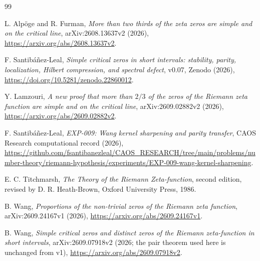 \documentclass[11pt]{article}
\theoremstyle{remark}
\begin{document}
\begin{thebibliography}{99}
\raggedright

L. Alp\"oge and R. Furman,
\emph{More than two thirds of the zeta zeros are simple and on the critical line},
arXiv:2608.13637v2 (2026),
\url{https://arxiv.org/abs/2608.13637v2}.

F. Santib\'a\~nez-Leal,
\emph{Simple critical zeros in short intervals: stability, parity,
localization, Hilbert compression, and spectral defect}, v0.07,
Zenodo (2026),
\url{https://doi.org/10.5281/zenodo.22860012}.

Y. Lamzouri,
\emph{A new proof that more than $2/3$ of the zeros of the Riemann zeta
function are simple and on the critical line},
arXiv:2609.02882v2 (2026),
\url{https://arxiv.org/abs/2609.02882v2}.

F. Santib\'a\~nez-Leal,
\emph{EXP-009: Wang kernel sharpening and parity transfer},
CAOS Research computational record (2026),
\url{https://github.com/fsantibanezleal/CAOS_RESEARCH/tree/main/problems/number-theory/riemann-hypothesis/experiments/EXP-009-wang-kernel-sharpening}.

E. C. Titchmarsh,
\emph{The Theory of the Riemann Zeta-function}, second edition,
revised by D. R. Heath-Brown, Oxford University Press, 1986.

B. Wang,
\emph{Proportions of the non-trivial zeros of the Riemann zeta function},
arXiv:2609.24167v1 (2026),
\url{https://arxiv.org/abs/2609.24167v1}.

B. Wang,
\emph{Simple critical zeros and distinct zeros of the Riemann zeta-function
in short intervals},
arXiv:2609.07918v2 (2026; the pair theorem used here is unchanged from v1),
\url{https://arxiv.org/abs/2609.07918v2}.

\end{thebibliography}
\end{document}
